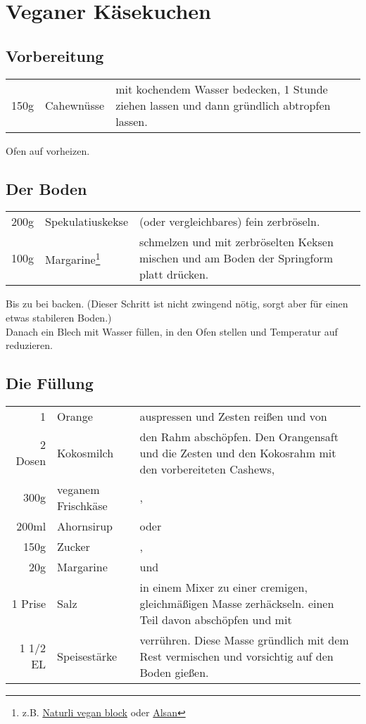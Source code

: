 \section{Veganer Käsekuchen}
\subsection*{Vorbereitung}
\begin{longtable}{rlL{17.6cm}}
	150g	&	Cahewnüsse	&	mit kochendem Wasser bedecken, 1 Stunde ziehen lassen und dann gründlich abtropfen lassen.
\end{longtable}

Ofen auf  vorheizen.
\subsection*{Der Boden}
\begin{longtable}{rlL{16.8cm}}
	200g	&	Spekulatiuskekse	&	(oder vergleichbares) fein zerbröseln. \\
	100g	&	Margarine\footnote{\label{foot:margarine}z.B. \href{https://www.bio123.de/produkt/naturli/naturli-organic-vegan-block-200g}{Naturli vegan block}
                            oder \href{https://www.alsan.de/alsan-bio/}{Alsan}}
									&	schmelzen und mit zerbröselten Keksen mischen und am Boden der Springform platt drücken. \\
\end{longtable}

Bis zu  bei  backen. (Dieser Schritt ist nicht zwingend nötig, sorgt aber für einen etwas stabileren Boden.)\\
Danach ein Blech mit Wasser füllen, in den Ofen stellen und Temperatur auf  reduzieren.
	
\subsection*{Die Füllung}
\begin{longtable}{rlL{15.49cm}}
	1		&	Orange				&	auspressen und Zesten reißen und von\\
	2 Dosen	&	Kokosmilch			&	den Rahm abschöpfen. Den Orangensaft und die Zesten und den Kokosrahm mit den vorbereiteten Cashews,\\
	300g	&	veganem Frischkäse	&	,\\
	200ml	&	Ahornsirup			&	oder\\
	150g	&	Zucker				&	,\\
	20g		&	Margarine
									&	und\\
	1 Prise	&	Salz				&	in einem Mixer zu einer cremigen, gleichmäßigen Masse zerhäckseln.
										einen Teil davon abschöpfen und mit\\
	1 1/2 EL	&	Speisestärke	&	verrühren. Diese Masse gründlich mit dem Rest vermischen und
										vorsichtig auf den Boden gießen. \\
\end{longtable}

